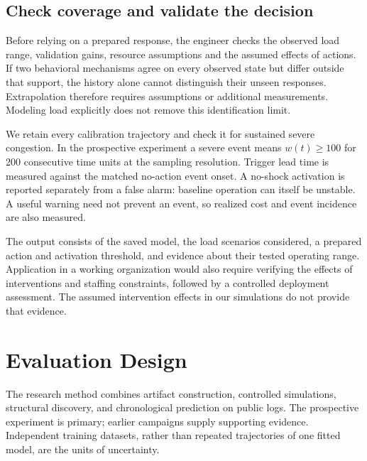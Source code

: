\documentclass[runningheads]{llncs}
\begin{document}
\subsection{Check coverage and validate the decision}
Before relying on a prepared response, the engineer checks the observed load range, validation gains, resource assumptions and the assumed effects of actions. If two behavioral mechanisms agree on every observed state but differ outside that support, the history alone cannot distinguish their unseen responses. Extrapolation therefore requires assumptions or additional measurements. Modeling load explicitly does not remove this identification limit.

We retain every calibration trajectory and check it for sustained severe congestion. In the prospective experiment a severe event means $w(t)\geq100$ for 200 consecutive time units at the sampling resolution. Trigger lead time is measured against the matched no-action event onset. A no-shock activation is reported separately from a false alarm: baseline operation can itself be unstable. A useful warning need not prevent an event, so realized cost and event incidence are also measured.

The output consists of the saved model, the load scenarios considered, a prepared action and activation threshold, and evidence about their tested operating range. Application in a working organization would also require verifying the effects of interventions and staffing constraints, followed by a controlled deployment assessment. The assumed intervention effects in our simulations do not provide that evidence.

\section{Evaluation Design}
The research method combines artifact construction, controlled simulations, structural discovery, and chronological prediction on public logs. The prospective experiment is primary; earlier campaigns supply supporting evidence. Independent training datasets, rather than repeated trajectories of one fitted model, are the units of uncertainty.
\end{document}
